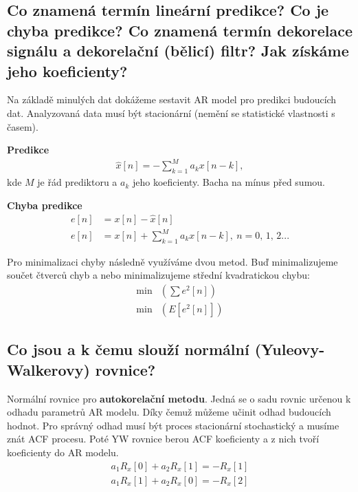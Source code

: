 \documentclass[a4paper,12pt]{article}   %
\newcommand{\mt}[1]{$#1$}
\begin{document}
\FloatBarrier

\subsection{Co znamená termín lineární predikce? Co je chyba predikce? Co znamená termín dekorelace signálu a dekorelační (bělicí) filtr? Jak získáme jeho koeficienty?}\label{sec:lin:predikce}

Na základě minulých dat dokážeme sestavit AR model pro predikci budoucích dat. Analyzovaná data musí být stacionární (nemění se statistické vlastnosti s časem).

\textbf{Predikce}
\begin{align*}
        \hat{x}[n] = -\sum ^M _{k=1} a_k x[n-k],
\end{align*}
kde \mt{M} je řád prediktoru a \mt{a_k} jeho koeficienty. Bacha na mínus před sumou.

\textbf{Chyba predikce}
\begin{align*}
        e[n] &= x[n] - \hat{x}[n]\\
        e[n] &= x[n] + \sum_{k=1}^M a_k x[n-k],~n=0,\,1,\,2...
\end{align*}

Pro minimalizaci chyby následně využíváme dvou metod. Buď minimalizujeme součet čtverců chyb a nebo minimalizujeme střední kvadratickou chybu:
\begin{align*}
        \text{min}&(\sum e^2[n] )\\
        \text{min}&(E[e^2[n]])
\end{align*}


\subsection{Co jsou a k čemu slouží normální (Yuleovy-Walkerovy) rovnice?}\label{sec:yule}
Normální rovnice pro \textbf{autokorelační metodu}. Jedná se o sadu rovnic určenou k odhadu parametrů AR modelu. Díky čemuž můžeme učinit odhad budoucích hodnot. Pro správný odhad musí být proces stacionární stochastický a musíme znát ACF procesu. Poté YW rovnice berou ACF koeficienty a z nich tvoří koeficienty do AR modelu.
\begin{align*}
        a_1 R_x[0] + a_2 R_x[1] = -R_x[1]\\
        a_1 R_x[1] + a_2 R_x[0] = -R_x[2]
\end{align*}


\end{document}
